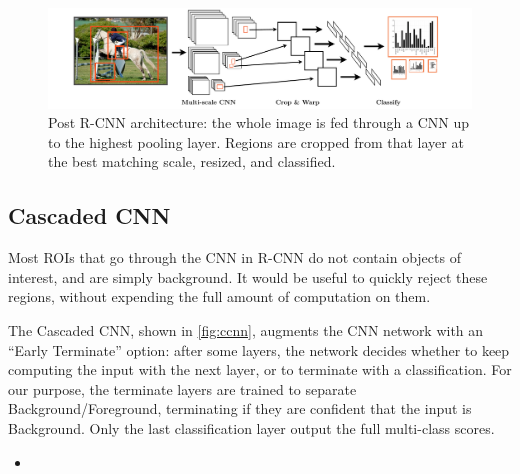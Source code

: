 \begin{figure}[h!]
\begin{center}
\includegraphics[width=0.98\columnwidth]{figures/dense_rcnn.pdf}
\caption{
Post R-CNN architecture: the whole image is fed through a CNN up to the highest pooling layer.
Regions are cropped from that layer at the best matching scale, resized, and classified.
}\label{fig:dense_rcnn}
\end{center}
\end{figure}

\subsection{Cascaded CNN}\label{sec:ccnn}

Most ROIs that go through the CNN in R-CNN do not contain objects of interest, and are simply background.
It would be useful to quickly reject these regions, without expending the full amount of computation on them.

The Cascaded CNN, shown in \autoref{fig:ccnn}, augments the CNN network with an ``Early Terminate'' option: after some layers, the network decides whether to keep computing the input with the next layer, or to terminate with a classification.
For our purpose, the terminate layers are trained to separate Background/Foreground, terminating if they are confident that the input is Background.
Only the last classification layer output the full multi-class scores.

\begin{itemize}
\itemsep1pt\parskip0pt
\item
\end{itemize}


